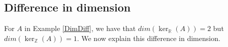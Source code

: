 \documentclass{article}
\newcommand{\Z}[0]{\mathbb{Z}}		%
\newcommand{\R}[0]{\mathbb{R}}		%
\newtheorem{thm}{Theorem}[section]
\theoremstyle{definition}
\theoremstyle{remark}
\begin{document}
\subsection{Difference in dimension}
For $A$ in Example \ref{DimDiff}, we have that $dim(\ker_\R(A))=2$ but $dim(\ker_\Z(A))=1$. We now explain this difference in dimension. 



\end{document}
